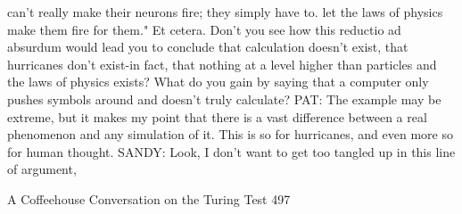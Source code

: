    can't really make their neurons fire; they simply have to. let the laws of physics
   make them fire for them." Et cetera. Don't you see how this reductio ad absurdum
   would lead you to conclude that calculation doesn't exist, that hurricanes don't
   exist-in fact, that nothing at a level higher than particles and the laws of physics
   exists? What do you gain by saying that a computer only pushes symbols around
   and doesn't truly calculate?
PAT: The example may be extreme, but it makes my point that there is a vast
   difference between a real phenomenon and any simulation of it. This is so for
   hurricanes, and even more so for human thought.
SANDY: Look, I don't want to get too tangled up in this line of argument,




A Coffeehouse Conversation on the Turing Test                                        497

